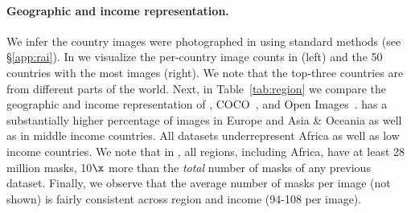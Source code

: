 \begin{table}[t]\centering
{}\vspace{-2mm}
\caption{Comparison of geographic and income representation. \sad has higher representation in Europe and Asia \& Oceania as well as middle income countries. Images from Africa, Latin America \& Caribbean, as well as low income countries, are underrepresented in all datasets.}
\label{tab:region}\vspace{0mm}
\end{table}

\paragraph{Geographic and income representation.} We infer the country images were photographed in using standard methods (see \S\ref{app:rai}). In  we visualize the per-country image counts in \sad (left) and the 50 countries with the most images (right). We note that the top-three countries are from different parts of the world. Next, in Table~\ref{tab:region} we compare the geographic and income representation of \sad, COCO~\cite{Lin2014}, and Open Images~\cite{OpenImages}. \sad has a substantially higher percentage of images in Europe and Asia \& Oceania as well as in middle income countries. All datasets underrepresent Africa as well as low income countries. We note that in \sad, all regions, including Africa, have at least 28 million masks, 10$\x$ more than the \emph{total} number of masks of any previous dataset. Finally, we observe that the average number of masks per image (not shown) is fairly consistent across region and income (94-108 per image).

